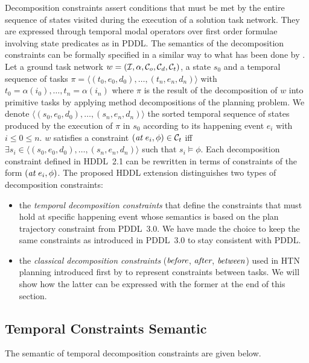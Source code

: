 \documentclass[letterpaper]{article} %
\newcommand{\at}{\text{\it at}}
\newcommand{\before}{\text{\it before}}
\newcommand{\after}{\text{\it after}}
\renewcommand{\between}{\text{\it between}}
\begin{document}
Decomposition constraints assert conditions that must be met by the entire sequence of states visited during the execution of a solution task network. They are expressed through temporal modal operators over first order formulae involving state predicates as in PDDL. The semantics of the decomposition constraints can be formally specified in a similar way to what has been done by \citep{gerevini05}. Let a ground task network $w = ({\cal{I}}, \alpha, {\cal{C}}_o, {\cal{C}}_d, {\cal{C}}_t)$, a state $s_0$ and a temporal sequence of tasks $\pi = \langle (t_0, e_0, d_0), \ldots, (t_n, e_n, d_n) \rangle $ with $t_0 = \alpha(i_0), \ldots, t_n = \alpha(i_n)$ where $\pi$ is the result of the decomposition of $w$ into primitive tasks by applying method decompositions of the planning problem. We denote $\langle (s_0, e_0, d_0), \ldots, (s_n, e_n, d_n) \rangle$ the sorted temporal sequence of states produced by the execution of $\pi$ in $s_0$ according to its happening event $e_i$ with $i \leq 0 \leq n$. $w$ satisfies a constraint $(\at \ e_i, \phi) \in {\cal{C}}_t$ iff   $\exists s_i \in \langle (s_0, e_0, d_0), \ldots, (s_n, e_n, d_n) \rangle$ such that $s_i \models \phi$. Each decomposition constraint defined in HDDL~2.1 can be rewritten in terms of constraints of the form $(\at \ e_i, \phi)$. The proposed HDDL extension distinguishes two types of decomposition constraints: 
\begin{itemize}
    \item the {\em temporal decomposition constraints} that define the constraints that must hold at specific happening event whose semantics is based on the plan trajectory constraint from PDDL~3.0. We have made the choice to keep the same constraints as introduced in PDDL~3.0 to stay consistent with PDDL. 
    \item the {\em classical decomposition constraints} ($\before$, $\after$, $\between$) used in HTN planning introduced first by \citep{erol94} to represent constraints between tasks. We will show how the latter can be expressed with the former at the end of this section.
\end{itemize}
     
\subsection{Temporal Constraints Semantic}

The semantic of temporal decomposition constraints are given below.
\end{document}
